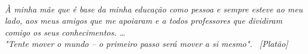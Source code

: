 \newpage\clearpage\pagebreak
\pagestyle{plain}
~\vfill
\begin{flushright}
    \textit{À minha mãe que é base da minha educação como pessoa e sempre esteve ao meu lado, aos meus amigos que me apoiaram e a todos professores que dividiram comigo os seus conhecimentos. \ldots} \\

    \vspace{1cm}
    \textit{"Tente mover o mundo – o primeiro passo será mover a si mesmo".~
[Platão]}
\end{flushright}

